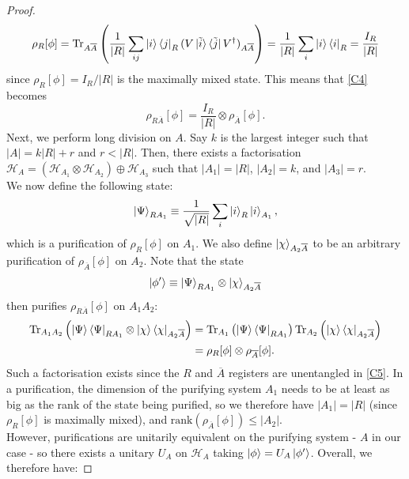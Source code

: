 \documentclass[12pt,a4paper]{report}
\numberwithin{equation}{section}
\newcommand{\ketbra}[2]{\ket{#1}\bra{#2}}
\newcommand{\ketbras}[1]{\ketbra{#1}{#1}}
\newcommand{\ol}[1]{\overline{#1}}
\theoremstyle{definition}
\theoremstyle{theorem}
\theoremstyle{theorem}
\theoremstyle{example}
\theoremstyle{definition}
\begin{document}
\begin{proof}
\begin{equation}
		\rho_{R}[\phi]=\text{Tr}_{A\overline{A}}\left(\frac{1}{|R|}\sum_{ij}\ketbra{i}{j}_{R}(V\ketbra{\tilde{i}}{\tilde{j}}V^{\dagger})_{A\overline{A}}\right)=\frac{1}{|R|}\sum_{i}\ketbras{i}_{R}=\frac{I_{R}}{|R|}
	\end{equation}
	since $\rho_{R}[\phi]=I_{R}/|R|$ is the maximally mixed state. This means that \ref{C4} becomes
	\begin{equation}\label{C5}
		\rho_{R\overline{A}}[\phi]=\frac{I_{R}}{|R|}\otimes\rho_{\overline{A}}[\phi].
	\end{equation}
	Next, we perform long division on $A$. Say $k$ is the largest integer such that $|A|=k|R|+r$ and $r<|R|$. Then, there exists a factorisation $\mathcal{H}_{A}=\left(\mathcal{H}_{A_{1}}\otimes\mathcal{H}_{A_{2}}\right)\oplus\mathcal{H}_{A_{3}}$ such that $|A_{1}|=|R|$, $|A_{2}|=k$, and $|A_{3}|=r$.\\
	We now define the following state:
	\begin{equation}
		\ket{\Psi}_{RA_{1}}\equiv\frac{1}{\sqrt{|R|}}\sum_{i}\ket{i}_{R}\ket{i}_{A_{1}},
	\end{equation}
	which is a purification of $\rho_{R}[\phi]$ on $A_{1}$. We also define $\ket{\chi}_{A_{2}\ol{A}}$ to be an arbitrary purification of $\rho_{\ol{A}}[\phi]$ on $A_{2}$. Note that the state
	\begin{equation}
		\ket{\phi'}\equiv\ket{\Psi}_{RA_{1}}\otimes\ket{\chi}_{A_{2}\overline{A}}
	\end{equation}
	then purifies $\rho_{R\overline{A}}[\phi]$ on $A_{1}A_{2}$:
	\begin{equation}
		\begin{aligned}
			\text{Tr}_{A_{1}A_{2}}\left(\ketbras{\Psi}_{RA_{1}}\otimes\ketbras{\chi}_{A_{2}\overline{A}}\right)&=\text{Tr}_{A_{1}}\left(\ketbras{\Psi}_{RA_{1}}\right)\text{Tr}_{A_{2}}\left(\ketbras{\chi}_{A_{2}\overline{A}}\right)\\&=\rho_{R}[\phi]\otimes\rho_{\overline{A}}[\phi].
		\end{aligned}
	\end{equation}
	Such a factorisation exists since the $R$ and $\ol{A}$ registers are unentangled in \ref{C5}. In a purification, the dimension of the purifying system $A_{1}$ needs to be at least as big as the rank of the state being purified, so we therefore have $|A_{1}|=|R|$ (since $\rho_{R}[\phi]$ is maximally mixed), and $\text{rank}\left(\rho_{\overline{A}}[\phi]\right)\leq|A_{2}|$.\\
	However, purifications are unitarily equivalent on the purifying system - $A$ in our case - so there exists a unitary $U_{A}$ on $\mathcal{H}_{A}$ taking $\ket{\phi}=U_{A}\ket{\phi'}$. Overall, we therefore have:

\end{proof}
\end{document}
